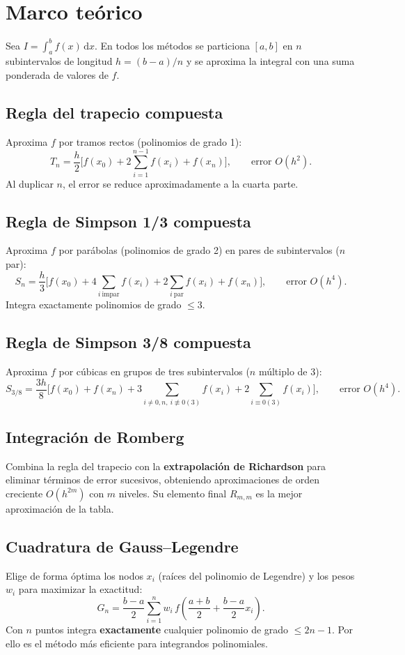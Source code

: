 \documentclass[12pt,a4paper]{article}
\newcommand{\dd}{\,\mathrm{d}}
\begin{document}
\section{Marco teórico}
Sea $I=\int_a^b f(x)\dd x$. En todos los métodos se particiona $[a,b]$ en $n$
subintervalos de longitud $h=(b-a)/n$ y se aproxima la integral con una suma
ponderada de valores de $f$.

\subsection{Regla del trapecio compuesta}
Aproxima $f$ por tramos rectos (polinomios de grado 1):
\[
  T_n = \frac{h}{2}\Big[f(x_0)+2\sum_{i=1}^{n-1}f(x_i)+f(x_n)\Big],
  \qquad \text{error } O(h^2).
\]
Al duplicar $n$, el error se reduce aproximadamente a la cuarta parte.

\subsection{Regla de Simpson 1/3 compuesta}
Aproxima $f$ por parábolas (polinomios de grado 2) en pares de subintervalos
($n$ par):
\[
  S_n = \frac{h}{3}\Big[f(x_0)+4\!\!\sum_{i\ \text{impar}}\!\!f(x_i)
        +2\!\!\sum_{i\ \text{par}}\!\!f(x_i)+f(x_n)\Big],
  \qquad \text{error } O(h^4).
\]
Integra exactamente polinomios de grado $\le 3$.

\subsection{Regla de Simpson 3/8 compuesta}
Aproxima $f$ por cúbicas en grupos de tres subintervalos ($n$ múltiplo de 3):
\[
  S_{3/8} = \frac{3h}{8}\big[f(x_0)+f(x_n)
        +3\!\!\sum_{i\neq0,n,\ i\not\equiv 0 (3)}\!\!f(x_i)
        +2\!\!\sum_{i\equiv 0 (3)}\!\!f(x_i)\big],
  \qquad \text{error } O(h^4).
\]

\subsection{Integración de Romberg}
Combina la regla del trapecio con la \textbf{extrapolación de Richardson} para
eliminar términos de error sucesivos, obteniendo aproximaciones de orden
creciente $O(h^{2m})$ con $m$ niveles. Su elemento final $R_{m,m}$ es la mejor
aproximación de la tabla.

\subsection{Cuadratura de Gauss--Legendre}
Elige de forma óptima los nodos $x_i$ (raíces del polinomio de Legendre) y los
pesos $w_i$ para maximizar la exactitud:
\[
  G_n = \frac{b-a}{2}\sum_{i=1}^{n} w_i\, f\!\left(\frac{a+b}{2}
        +\frac{b-a}{2}x_i\right).
\]
Con $n$ puntos integra \textbf{exactamente} cualquier polinomio de grado
$\le 2n-1$. Por ello es el método más eficiente para integrandos polinomiales.
\end{document}
